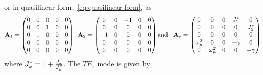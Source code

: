 or in quasilinear form,~\eqref{eq:quasilinear-form}, as 
\begin{align*}
  \mathbf{A}_1 = 
  \begin{pmatrix}
    0 & 0 & 0 & 0 & 0 \\
    0 & 0 & 1 & 0 & 0 \\
    0 & 1 & 0 & 0 & 0 \\
    0 & 0 & 0 & 0 & 0 \\
    0 & 0 & 0 & 0 & 0 \\
  \end{pmatrix}
  \: \:
  \mathbf{A}_2 = 
  \begin{pmatrix}
    0 & 0 &-1 & 0 & 0 \\
    0 & 0 & 0 & 0 & 0 \\
   -1 & 0 & 0 & 0 & 0 \\
    0 & 0 & 0 & 0 & 0 \\
    0 & 0 & 0 & 0 & 0 \\
  \end{pmatrix}
  \textrm{and}\;\;\;
  \mathbf{A}_s = 
  \begin{pmatrix}
    0 & 0 & 0 & J_{1}^* & 0 \\
    0 & 0 & 0 & 0 & J_{2}^* \\
    0 & 0 & 0 & 0 & 0 \\
    \omega_p^2 & 0 & 0 & -\gamma & 0 \\
    0 & \omega_p^2 & 0 & 0 & -\gamma \\
  \end{pmatrix}
\end{align*}
where $J_{k}^* = 1 + \frac{J_{k}}{J^p_{k}}$. The $TE_z$ mode is given by

